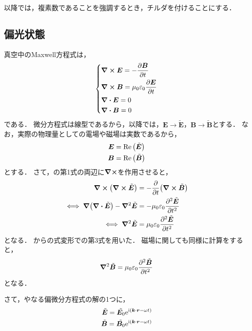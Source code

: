 \documentclass{report}
\begin{document}
  以降では，複素数であることを強調するとき，チルダを付けることにする．
  \subsection{偏光状態}
    真空中のMaxwell方程式は，
    \begin{align}
      \begin{dcases}
        \curl \bm{E} = -\pdv{\bm{B}}{t} \\ 
        \curl \bm{B} = \mu_0\varepsilon_0\pdv{\bm{E}}{t} \\ 
        \div \bm{E} = 0 \\ \label{maxwell-vacuume}
        \div \bm{B} = 0
      \end{dcases}
    \end{align}
    である．
    微分方程式は線型であるから，以降では，$\bm{E} \to \tilde{\bm{E}}$，$\bm{B} \to \tilde{\bm{B}}$とする．
    なお，実際の物理量としての電場や磁場は実数であるから，
    \begin{align}
      \bm{E} &= \Re\qty(\tilde{\bm{E}}) \\ 
      \bm{B} &= \Re\qty(\tilde{\bm{B}})
    \end{align}
    とする．
    さて，の第1式の両辺に$\curl$を作用させると，
    \begin{align}
      \curl\qty(\curl \tilde{\bm{E}}) &= -\pdv{t}\qty(\curl{\tilde{\bm{B}}}) \\ 
      \iff \grad\qty(\div\tilde{\bm{E}}) - \grad^2\tilde{\bm{E}} &= -\mu_0\varepsilon_0\pdv[2]{\tilde{\bm{E}}}{t} \label{electro-field-wave-1}\\ 
      \iff \grad^2\tilde{\bm{E}} &= \mu_0\varepsilon_0\pdv[2]{\tilde{\bm{E}}}{t} \label{electro-field-wave-2} \\ 
    \end{align}
    となる．
    からの式変形での第3式を用いた．
    磁場に関しても同様に計算をすると，
    \begin{align}
      \grad^2\tilde{\bm{B}} &= \mu_0\varepsilon_0\pdv[2]{\tilde{\bm{B}}}{t} \label{magnetic-field-wave-2} \\ 
    \end{align}
    となる．
    \par
    さて，やなる偏微分方程式の解の1つに，
    \begin{align}
      \tilde{\bm{E}} = \tilde{\bm{E}_0}\mathrm{e}^{\mathrm{i}(\bm{k}\cdot \bm{r} - \omega t)} \label{electro-field-wave-3} \\ 
      \tilde{\bm{B}} = \tilde{\bm{B}_0}\mathrm{e}^{\mathrm{i}(\bm{k}\cdot \bm{r} - \omega t)} \label{magnetic-field-wave-3}
    \end{align}
\end{document}
